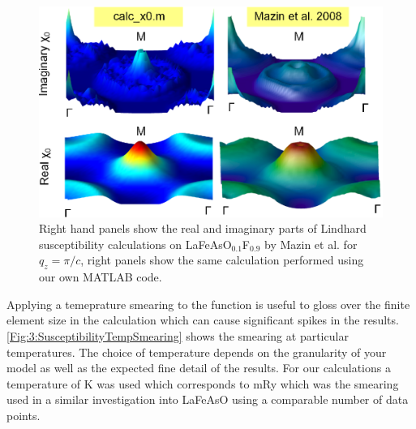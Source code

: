 \begin{figure}[htbp]
    \begin{center}
        \includegraphics[scale=0.9]{Chapter3-dHvABaFe2P2/Figures/AngleDepMeasurements/SusceptibilityMazinComparison/SusceptibilityMazinComparison}
        \caption{Right hand panels show the real and imaginary parts of Lindhard susceptibility calculations on LaFeAsO$_{0.1}$F$_{0.9}$ by Mazin et al. for $q_z=\pi/c$, right panels show the same calculation performed using our own MATLAB code.}
        \label{Fig:3:MazinX0Comparison}
    \end{center}
\end{figure}

Applying a temeprature smearing to the function is useful to gloss over the finite element size in the calculation which can cause significant spikes in the results. \Fig\ref{Fig:3:SusceptibilityTempSmearing} shows the smearing at particular temperatures. The choice of temperature depends on the granularity of your model as well as the expected fine detail of the results. For our calculations a temperature of \unit[158]{K} was used which corresponds to \unit[1]{mRy} which was the smearing used in a similar investigation into LaFeAsO using a comparable number of data points\cite{Mazin2008}.

